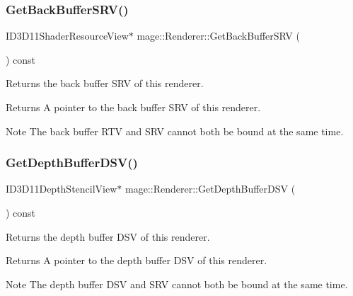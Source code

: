 \subsubsection{\texorpdfstring{Get\+Back\+Buffer\+S\+R\+V()}{GetBackBufferSRV()}}
{\footnotesize\ttfamily I\+D3\+D11\+Shader\+Resource\+View$\ast$ mage\+::\+Renderer\+::\+Get\+Back\+Buffer\+S\+RV (\begin{DoxyParamCaption}{ }\end{DoxyParamCaption}) const\hspace{0.3cm}{\ttfamily [noexcept]}}

Returns the back buffer S\+RV of this renderer.

\begin{DoxyReturn}{Returns}
A pointer to the back buffer S\+RV of this renderer. 
\end{DoxyReturn}
\begin{DoxyNote}{Note}
The back buffer R\+TV and S\+RV cannot both be bound at the same time. 
\end{DoxyNote}
\hypertarget{classmage_1_1_renderer_a0e292945b845c16cc4fa113ecb6d14c5}{}\label{classmage_1_1_renderer_a0e292945b845c16cc4fa113ecb6d14c5} 
\subsubsection{\texorpdfstring{Get\+Depth\+Buffer\+D\+S\+V()}{GetDepthBufferDSV()}}
{\footnotesize\ttfamily I\+D3\+D11\+Depth\+Stencil\+View$\ast$ mage\+::\+Renderer\+::\+Get\+Depth\+Buffer\+D\+SV (\begin{DoxyParamCaption}{ }\end{DoxyParamCaption}) const\hspace{0.3cm}{\ttfamily [noexcept]}}

Returns the depth buffer D\+SV of this renderer.

\begin{DoxyReturn}{Returns}
A pointer to the depth buffer D\+SV of this renderer. 
\end{DoxyReturn}
\begin{DoxyNote}{Note}
The depth buffer D\+SV and S\+RV cannot both be bound at the same time. 
\end{DoxyNote}
\hypertarget{classmage_1_1_renderer_a1e76970e43b0a4b734043f179d5f146d}{}\label{classmage_1_1_renderer_a1e76970e43b0a4b734043f179d5f146d} 
